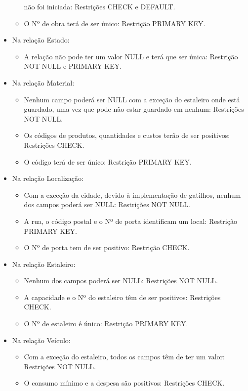 \documentclass{report}
\begin{document}
\begin{itemize}
\begin{itemize}
				não foi iniciada: Restrições CHECK e DEFAULT.
				\item O Nº de obra terá de ser único: Restrição PRIMARY KEY.
			\end{itemize}
			\item Na relação Estado:
			\begin{itemize}
				\item A relação não pode ter um valor NULL e terá que ser única: Restrição NOT 
				NULL e PRIMARY KEY.		
			\end{itemize}
			\item Na relação Material:
			\begin{itemize}
				\item Nenhum campo poderá ser NULL com a exceção do estaleiro onde está 
				guardado, uma vez que pode não estar guardado em nenhum: Restrições NOT NULL.
				\item Os códigos de produtos, quantidades e custos terão de ser positivos: 
				Restrições CHECK.
				\item O código terá de ser único: Restrição PRIMARY KEY.
			\end{itemize}
			\item Na relação Localização:
			\begin{itemize}
				\item Com a exceção da cidade, devido à implementação de gatilhos, 
				nenhum dos campos poderá ser NULL: Restrições NOT NULL.
				\item A rua, o código postal e o Nº de porta identificam um local: Restrição 
				PRIMARY KEY.
				\item O Nº de porta tem de ser positivo: Restrição CHECK.
			\end{itemize}
			\item Na relação Estaleiro:
			\begin{itemize}
				\item Nenhum dos campos poderá ser NULL: Restrições NOT NULL.
				\item A capacidade e o Nº do estaleiro têm de ser positivos: Restrições CHECK.
				\item O Nº de estaleiro é único: Restrição PRIMARY KEY.
			\end{itemize}
			\item Na relação Veículo:
			\begin{itemize}
				\item Com a exceção do estaleiro, todos os campos têm de ter um valor: 
				Restrições NOT NULL.
				\item O consumo mínimo e a despesa são positivos: Restrições CHECK.

\end{itemize}
\end{itemize}
\end{document}
